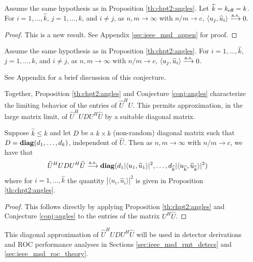 \begin{Th}\label{th:other angles}
Assume the same hypothesis as in Proposition \ref{th:chpt2:angles}. Let $\widehat{k}=k_\text{eff}=k$. For $i=1,\dots,\widehat{k}$, $j=1,\dots,k$, and $i\neq j$, as $n,m\to\infty$ with $n/m\to c$, $\langle u_j,\widehat{u}_i\rangle \overset{\textrm{a.s.}}{\longrightarrow} 0.$
\end{Th}
\begin{proof}
This is a new result. See Appendix \ref{sec:ieee_msd_appen} for proof.
\end{proof}\vskip0.25cm

\begin{Conj}\label{conj:angles}
Assume the same hypothesis as in Proposition \ref{th:chpt2:angles}. For $i=1,\dots,\widehat{k}$, $j=1,\dots,k$, and $i\neq j$, as $n,m\to\infty$ with $n/m\to c$, $\langle u_j,\widehat{u}_i\rangle \overset{\textrm{a.s.}}{\longrightarrow} 0$.
\end{Conj}
\begin{Remark}
See Appendix for a brief discussion of this conjecture.
\end{Remark}

Together, Proposition \ref{th:chpt2:angles} and Conjecture \ref{conj:angles} characterize the limiting behavior of the entries of $\widehat{U}^HU$. This permits approximation, in the large matrix limit, of  $\widehat{U}^HU D U^H\widehat{U}$ by a suitable diagonal matrix.

\begin{Corr}\label{corr:matrix}
Suppose $\widehat{k}\leq k$ and let $D$ be a $k \times k$ (non-random) diagonal matrix such that $D=\mathop{\bf diag}(d_1,\ldots,d_{k})$, independent of $\widehat{U}$. Then as $n,m \longrightarrow \infty$ with $n/m \to c$, we have that
\begin{equation*}
\widehat{U}^HU D U^H\widehat{U}\overset{\textrm{a.s.}}{\longrightarrow} \mathop{\bf diag}(d_1 |\langle u_1,\widehat{u}_1\rangle|^2,\dots, d_{\widehat{k}} |\langle u_{\widehat{k}},\widehat{u}_{\widehat{k}}\rangle|^2)
\end{equation*}
where for $i=1,\dots,\widehat{k}$ the quantity $|\langle u_i,\widehat{u}_i\rangle|^2$ is given in Proposition \ref{th:chpt2:angles}.
\end{Corr}
\begin{proof}
This follows directly by applying Proposition \ref{th:chpt2:angles} and Conjecture \ref{conj:angles} to the entries of the matrix $U^H\widehat{U}$.
\end{proof}

This diagonal approximation of $\widehat{U}^HU D U^H\widehat{U}$ will be used in detector derivations and ROC performance analyses in Sections \ref{sec:ieee_msd_rmt_detecs} and \ref{sec:ieee_msd_roc_theory}.

